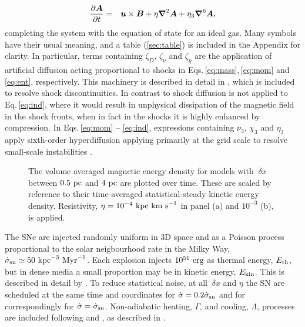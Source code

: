 \documentclass[preprint2]{aastex63}
\newcommand\SNr{\dot\sigma_{\rm sn}}
\newcommand\ESK{E_{\rm kin}}
\newcommand\EST{E_{\rm th}}
\newcommand{\vect}[1]{{{\mbox{\boldmath $#1$}}}}%
\newcommand\kpc{~ {\rm kpc}}
\newcommand\pc{~ {\rm pc}}
\newcommand\dx{~ {\delta x}}
\newcommand\Myr{~ {\rm Myr}}
\newcommand\erg{~ {\rm erg}}
\newcommand\kms{~ {\rm km~ s}^{-1}}
\begin{document}
  \begin{eqnarray}
  \label{eq:ind}
    \frac{\partial \vect{A}}{\partial t} &=&
    \vect{u}\times\vect{B}
    +\eta\vect\nabla^2\vect{A}
    +\eta_3\vect\nabla^6\vect{A},
  \end{eqnarray}
completing the system with the equation of state for an ideal gas.
Many symbols have their usual meaning, and a table (\ref{sec:table}) is
included in the Appendix for clarity.
In particular, terms containing $\zeta_D,\,\zeta_\nu$ and $\zeta_\eta$ are the
application of artificial diffusion acting proportional to shocks in 
Eqs.\,\eqref{eq:mass},\,\eqref{eq:mom} and \eqref{eq:ent}, respectively.
This machinery is described in detail in \citet{GMKSH20}, which is included to
resolve shock discontinuities.
In contrast to \citet{Gent:2013b} shock diffusion is not applied to
Eq.\,\eqref{eq:ind}, where it would result in unphysical dissipation of the
magnetic field in the shock fronts, when in fact in the shocks it is highly
enhanced by compression.
In Eqs.\,\eqref{eq:mom} -- \eqref{eq:ind}, expressions containing 
$\nu_3,\,\chi_3$ and $\eta_3$ apply sixth-order hyperdiffusion applying
primarily at the grid scale to resolve small-scale instabilities
\citep[see, e.g.,][]{ABGS02,HB04}.

\begin{figure*}
\caption{
The volume averaged magnetic energy density for models with $\dx$ between
$0.5\pc$ and $4\pc$ are plotted over time.
These are scaled by reference to their time-averaged statistical-steady kinetic
energy density.
Resistivity, $\eta=10^{-4}\kpc\kms$ in panel {\rm(a)} and $10^{-3}$ {\rm(b)}, is
applied.
\label{fig:eb-res}}
\end{figure*}

The SNe are injected randomly uniform in 3D space and as a Poisson
process proportional to the solar neigbourhood rate in the Milky Way,
 $\SNr\simeq 50\kpc^{-3}\Myr^{-1}$.
Each explosion injects $10^{51}\erg$ as thermal energy, $\EST$, but in dense
media a small proportion may be in kinetic energy, $\ESK$.
This is described in detail by \citet{GMKSH20}.
To reduce statistical noise, at all $\dx$ and $\eta$ the SN are
scheduled at the same time and coordinates for $\dot\sigma=0.2\SNr$ and for 
correspondingly for $\dot\sigma=\SNr$.
Non-adiabatic heating, $\Gamma$, and cooling, $\Lambda$, processes are included
following \citet{Wolfire:1995} and \citet{Sarazin:1987}, as described in 
\citet{Gent:2013a}.
\end{document}
